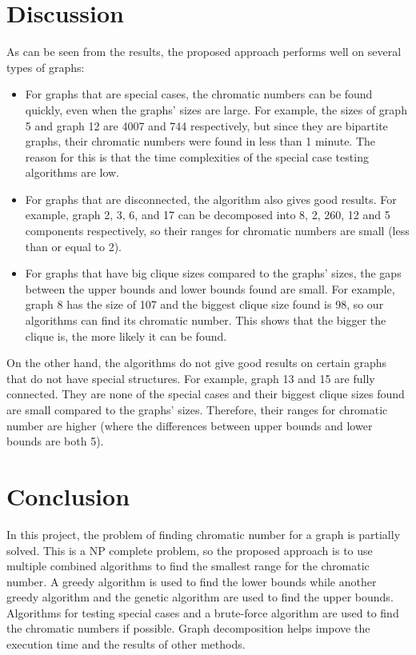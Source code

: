 \documentclass[a4paper]{report}
\begin{document}
	\chapter{Discussion}
	As can be seen from the results, the proposed approach performs well on several types of graphs:
	\begin{itemize}
		\item For graphs that are special cases, the chromatic numbers can be found quickly, even when the graphs' sizes are large. For example, the sizes of graph 5 and graph 12 are 4007 and 744 respectively, but since they are bipartite graphs, their chromatic numbers were found in less than 1 minute. The reason for this is that the time complexities of the special case testing algorithms are low.
		\item For graphs that are disconnected, the algorithm also gives good results. For example, graph 2, 3, 6, and 17 can be decomposed into 8, 2, 260, 12 and 5 components respectively, so their ranges for chromatic numbers are small (less than or equal to 2).
		\item For graphs that have big clique sizes compared to the graphs' sizes, the gaps between the upper bounds and lower bounds found are small. For example, graph 8 has the size of 107 and the biggest clique size found is 98, so our algorithms can find its chromatic number. This shows that the bigger the clique is, the more likely it can be found.
	\end{itemize}
	On the other hand, the algorithms do not give good results on certain graphs that do not have special structures. For example, graph 13 and 15 are fully connected. They are none of the special cases and their biggest clique sizes found are small compared to the graphs' sizes. Therefore, their ranges for chromatic number are higher (where the differences between upper bounds and lower bounds are both 5).
	
	\chapter{Conclusion}
	In this project, the problem of finding chromatic number for a graph is partially solved. This is a NP complete problem, so the proposed approach is to use multiple combined algorithms to find the smallest range for the chromatic number. A greedy algorithm is used to find the lower bounds while another greedy algorithm and the genetic algorithm are used to find the upper bounds. Algorithms for testing special cases and a brute-force algorithm are used to find the chromatic numbers if possible. Graph decomposition helps impove the execution time and the results of other methods. \\
	
\end{document}
